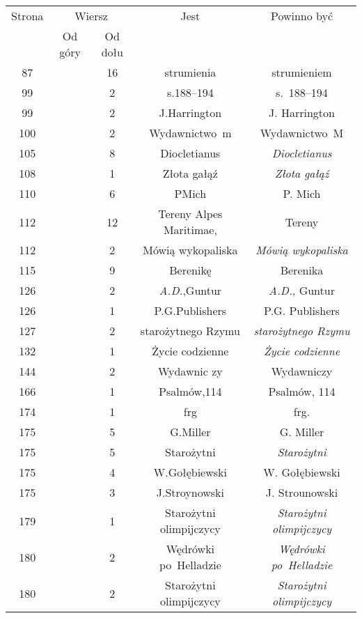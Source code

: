 \documentclass[a4paper,11pt]{article}
\begin{document}
\begin{center}
  \newpage

  \begin{tabular}{|c|c|c|c|c|}
    \hline
    Strona & \multicolumn{2}{c|}{Wiersz} & Jest
                              & Powinno być \\ \cline{2-3}
    & Od góry & Od dołu & & \\
    \hline
    87  & & 16 & strumienia & strumieniem \\
    99  & &  2 & s.188--194 & s.~188--194 \\
    99  & &  2 & J.Harrington & J. Harrington \\
    100 & &  2 & Wydawnictwo~m & Wydawnictwo~M \\
    105 & &  8 & Diocletianus & \textit{Diocletianus} \\
    108 & &  1 & Złota gałąź & \textit{Złota gałąź} \\
    110 & &  6 & PMich & P. Mich \\
    112 & & 12 & Tereny Alpes Maritimae, & Tereny \\
    112 & &  2 & Mówią wykopaliska & \textit{Mówią wykopaliska} \\
    115 & &  9 & Berenikę & Berenika \\
    126 & &  2 & \textit{A.D.},Guntur & \textit{A.D.}, Guntur \\
    126 & &  1 & P.G.Publishers & P.G. Publishers \\
    127 & &  2 & starożytnego Rzymu & \textit{starożytnego Rzymu} \\
    132 & &  1 & Życie codzienne & \textit{Życie codzienne} \\
    144 & &  2 & Wydawnic zy & Wydawniczy \\
    166 & &  1 & Psalmów,114 & Psalmów, 114 \\
    174 & &  1 & frg & frg. \\
    175 & &  5 & G.Miller & G. Miller \\
    175 & &  5 & Starożytni & \textit{Starożytni} \\
    175 & &  4 & W.Gołębiewski & W. Gołębiewski \\
    175 & &  3 & J.Stroynowski & J. Strounowski \\
    179 & &  1 & Starożytni olimpijczycy
           & \textit{Starożytni olimpijczycy} \\
    180 & &  2 & Wędrówki po~Helladzie & \textit{Wędrówki po~Helladzie} \\
    180 & &  2 & Starożytni olimpijczycy
           & \textit{Starożytni olimpijczycy} \\

\end{tabular}
\end{center}
\end{document}
